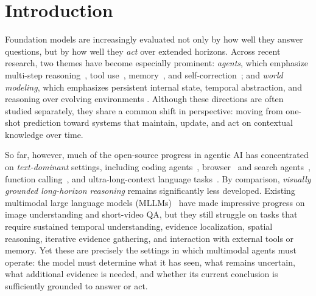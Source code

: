 \documentclass[11pt, letterpaper]{template}
\theoremstyle{plain}
\theoremstyle{definition}
\theoremstyle{remark}
\begin{document}
\maketitle

\section{Introduction}

Foundation models are increasingly evaluated not only by how well they answer questions, but by how well they \emph{act} over extended horizons. Across recent research, two themes have become especially prominent: \emph{agents}, which emphasize multi-step reasoning~\citep{react}, tool use~\citep{schick2023toolformer}, memory~\citep{park2023generative}, and self-correction~\citep{shinn2023reflexion}; and \emph{world modeling}, which emphasizes persistent internal state, temporal abstraction, and reasoning over evolving environments \citep{ha2018world}. Although these directions are often studied separately, they share a common shift in perspective: moving from one-shot prediction toward systems that maintain, update, and act on contextual knowledge over time.

So far, however, much of the open-source progress in agentic AI has concentrated on \emph{text-dominant} settings, including coding agents~\citep{yang2024swe, wang2025openhands}, browser~\citep{yao2022webshop,zhou2024webarena} and search agents~\citep{react,jin2025search,zheng2025deepresearcher}, function calling~\citep{schick2023toolformer, qin2024toolllm}, and ultra-long-context language tasks~\citep{zhang2024bench, bai2025longbench}. By comparison, \emph{visually grounded long-horizon reasoning} remains significantly less developed. Existing multimodal large language models (MLLMs)~\citep{qwen25vl,qwen3vl,internvl35,li2024llava} have made impressive progress on image understanding and short-video QA, but they still struggle on tasks that require sustained temporal understanding, evidence localization, spatial reasoning, iterative evidence gathering, and interaction with external tools or memory. Yet these are precisely the settings in which multimodal agents must operate: the model must determine what it has seen, what remains uncertain, what additional evidence is needed, and whether its current conclusion is sufficiently grounded to answer or act.
\end{document}
